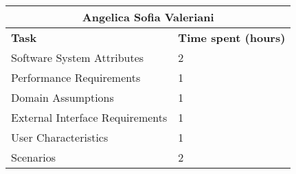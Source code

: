\begin{table}[h]
  \center
  \begin{tabular}{l|l}
    \multicolumn{2}{c}{\textbf{Angelica Sofia Valeriani}} \\
    \hline
    \textbf{Task} & \textbf{Time spent (hours)}\\
    \hline
    Software System Attributes & 2 \\
    Performance Requirements & 1 \\
    Domain Assumptions & 1 \\
    External Interface Requirements & 1 \\
    User Characteristics & 1 \\
    Scenarios & 2 \\
  \end{tabular}
\end{table}